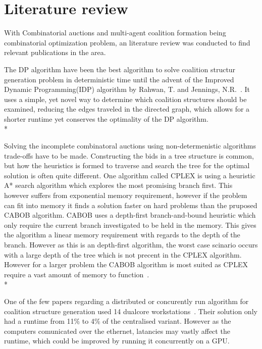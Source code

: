 \documentclass[a4paper, 12pt]{report}
\begin{document}
\section{Literature review}
With Combinatorial auctions and multi-agent coalition formation being combinatorial optimization problem, an literature review was conducted to find relevant publications in the area.

The DP algorithm have been the best algorithm to solve coalition structur generation problem in deterministic time until the advent of the Improved Dynamic Programming(IDP) algorithm by Rahwan, T. and Jennings, N.R.~\cite{rahwan2008improved}. It uses a simple, yet novel way to determine which coalition structures should be examined, reducing the edges traveled in the directed graph, which allows for a shorter runtime yet conserves the optimality of the DP algorithm.  \\*

Solving the incomplete combinatoral auctions using non-determenistic algorithms trade-offs have to be made. Constructing the bids in a tree structure is common, but how the heuristics is formed to traverse and search the tree for the optimal solution is often quite different. One algorithm called CPLEX is using a heuristic A* search algorithm which explores the most promising branch first. 
This however suffers from exponential memory requirement, however if the problem can fit into memory it finds a solution faster on hard problems than the pruposed CABOB algorithm. CABOB uses a depth-first branch-and-bound heuristic which only require the current branch investigated to be held in the memory. This gives the algorithm a linear memory requirement with regards to the depth of the branch. However as this is an depth-first algorithm, the worst case scinario occurs with a large depth of the tree which is not precent in the CPLEX algorithm. However for a larger problem the CABOB algorithm is most suited as CPLEX require a vast amount of memory to function~\cite{sandholm2002algorithm}.\\*

One of the few papers regarding a distributed or concurently run algorithm for coalition structure generation used 14 dualcore workstations~\cite{michalak2010distributed}. Their solution only had a runtime from 11\% to 4\% of the centralised variant. However as the computers comunicated over the ethernet, latancies may vastly affect the runtime, which could be improved by running it concurrently on a GPU.
\end{document}
